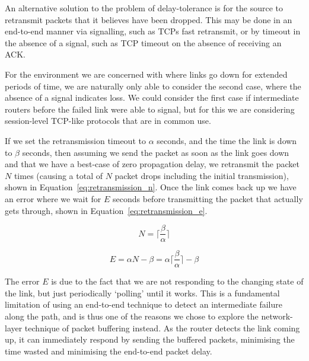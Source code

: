 \documentclass[withindex,glossary,openany]{cam-thesis}
\begin{document}
An alternative solution to the problem of delay-tolerance  is for the source to retransmit packets that it believes have been dropped. This may be done in an end-to-end manner via signalling, such as TCPs fast retransmit, or by timeout in the absence of a signal, such as TCP timeout on the absence of receiving an ACK.

For the environment we are concerned with where links go down for extended periods of time, we are naturally only able to consider the second case, where the absence of a signal indicates loss. We could consider the first case if intermediate routers before the failed link were able to signal, but for this we are considering session-level TCP-like protocols that are in common use.

If we set the retransmission timeout to $\alpha$ seconds, and the time the link is down to $\beta$ seconds, then assuming we send the packet as soon as the link goes down and that we have a best-case of zero propagation delay, we retransmit the packet $N$ times (causing a total of $N$ packet drops including the initial transmission), shown in Equation~\ref{eq:retransmission_n}. Once the link comes back up we have an error where we wait for $E$ seconds before transmitting the packet that actually gets through, shown in Equation~\ref{eq:retransmission_e}.

\begin{minipage}{0.35\textwidth}
\begin{equation} \label{eq:retransmission_n}
N = \Big\lceil\frac{\beta}{\alpha}\Big\rceil
\end{equation}
\end{minipage}%
\begin{minipage}{0.65\textwidth}
\begin{equation} \label{eq:retransmission_e}
E = \alpha N - \beta = \alpha \Big\lceil\frac{\beta}{\alpha}\Big\rceil - \beta
\end{equation}
\end{minipage}

The error $E$ is due to the fact that we are not responding to the changing state of the link, but just periodically `polling' until it works. This is a fundamental limitation of using an end-to-end technique to detect an intermediate failure along the path, and is thus one of the reasons we chose to explore the network-layer technique of packet buffering instead. As the router detects the link coming up, it can immediately respond by sending the buffered packets, minimising the time wasted and minimising the end-to-end packet delay.
\end{document}

